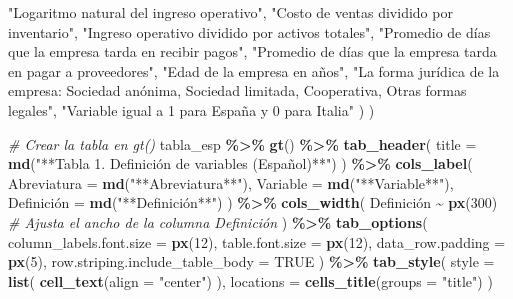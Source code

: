 \documentclass[
]{article}
\newenvironment{Shaded}{\begin{snugshade}}{\end{snugshade}}
\newcommand{\AttributeTok}[1]{\textcolor[rgb]{0.13,0.29,0.53}{#1}}
\newcommand{\CommentTok}[1]{\textcolor[rgb]{0.56,0.35,0.01}{\textit{#1}}}
\newcommand{\ConstantTok}[1]{\textcolor[rgb]{0.56,0.35,0.01}{#1}}
\newcommand{\DecValTok}[1]{\textcolor[rgb]{0.00,0.00,0.81}{#1}}
\newcommand{\FunctionTok}[1]{\textcolor[rgb]{0.13,0.29,0.53}{\textbf{#1}}}
\newcommand{\NormalTok}[1]{#1}
\newcommand{\OtherTok}[1]{\textcolor[rgb]{0.56,0.35,0.01}{#1}}
\newcommand{\SpecialCharTok}[1]{\textcolor[rgb]{0.81,0.36,0.00}{\textbf{#1}}}
\newcommand{\StringTok}[1]{\textcolor[rgb]{0.31,0.60,0.02}{#1}}
\begin{document}
\begin{Shaded}
\begin{Highlighting}[]
    \StringTok{"Logaritmo natural del ingreso operativo"}\NormalTok{, }
    \StringTok{"Costo de ventas dividido por inventario"}\NormalTok{, }
    \StringTok{"Ingreso operativo dividido por activos totales"}\NormalTok{, }
    \StringTok{"Promedio de días que la empresa tarda en recibir pagos"}\NormalTok{, }
    \StringTok{"Promedio de días que la empresa tarda en pagar a proveedores"}\NormalTok{, }
    \StringTok{"Edad de la empresa en años"}\NormalTok{, }
    \StringTok{"La forma jurídica de la empresa: Sociedad anónima, }
\StringTok{    Sociedad limitada, Cooperativa, Otras formas legales"}\NormalTok{,}
    \StringTok{"Variable igual a 1 para España y 0 para Italia"}
\NormalTok{  )}
\NormalTok{)}
\end{Highlighting}
\end{Shaded}

\begin{Shaded}
\begin{Highlighting}[]
\CommentTok{\# Crear la tabla en gt()}
\NormalTok{tabla\_esp }\SpecialCharTok{\%\textgreater{}\%}
  \FunctionTok{gt}\NormalTok{() }\SpecialCharTok{\%\textgreater{}\%}
  \FunctionTok{tab\_header}\NormalTok{(}
    \AttributeTok{title =} \FunctionTok{md}\NormalTok{(}\StringTok{"**Tabla 1. Definición de variables (Español)**"}\NormalTok{)}
\NormalTok{  ) }\SpecialCharTok{\%\textgreater{}\%}
  \FunctionTok{cols\_label}\NormalTok{(}
    \AttributeTok{Abreviatura =} \FunctionTok{md}\NormalTok{(}\StringTok{"**Abreviatura**"}\NormalTok{),}
    \AttributeTok{Variable =} \FunctionTok{md}\NormalTok{(}\StringTok{"**Variable**"}\NormalTok{),}
\NormalTok{    Definición }\OtherTok{=} \FunctionTok{md}\NormalTok{(}\StringTok{"**Definición**"}\NormalTok{)}
\NormalTok{  ) }\SpecialCharTok{\%\textgreater{}\%}
  \FunctionTok{cols\_width}\NormalTok{(}
\NormalTok{    Definición }\SpecialCharTok{\textasciitilde{}} \FunctionTok{px}\NormalTok{(}\DecValTok{300}\NormalTok{)  }\CommentTok{\# Ajusta el ancho de la columna Definición}
\NormalTok{  ) }\SpecialCharTok{\%\textgreater{}\%}
  \FunctionTok{tab\_options}\NormalTok{(}
    \AttributeTok{column\_labels.font.size =} \FunctionTok{px}\NormalTok{(}\DecValTok{12}\NormalTok{),}
    \AttributeTok{table.font.size =} \FunctionTok{px}\NormalTok{(}\DecValTok{12}\NormalTok{),}
    \AttributeTok{data\_row.padding =} \FunctionTok{px}\NormalTok{(}\DecValTok{5}\NormalTok{),}
    \AttributeTok{row.striping.include\_table\_body =} \ConstantTok{TRUE}
\NormalTok{  ) }\SpecialCharTok{\%\textgreater{}\%}
  \FunctionTok{tab\_style}\NormalTok{(}
    \AttributeTok{style =} \FunctionTok{list}\NormalTok{(}
      \FunctionTok{cell\_text}\NormalTok{(}\AttributeTok{align =} \StringTok{"center"}\NormalTok{)  }
\NormalTok{    ),}
    \AttributeTok{locations =} \FunctionTok{cells\_title}\NormalTok{(}\AttributeTok{groups =} \StringTok{"title"}\NormalTok{)  }
\NormalTok{  )}
\end{Highlighting}
\end{Shaded}
\end{document}
